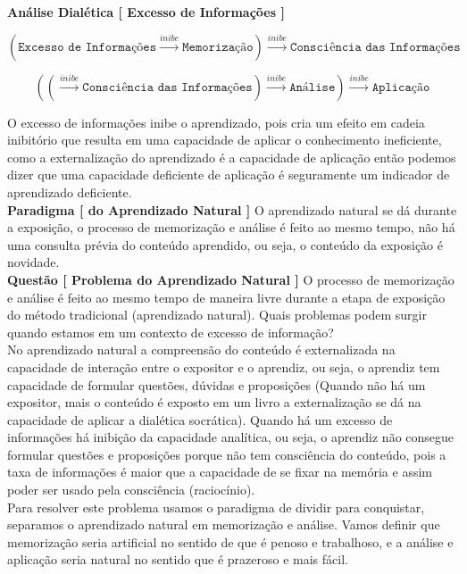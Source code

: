 \textbf{Análise Dialética [ Excesso de Informações ]}

$$  (\texttt{Excesso de Informações} \overset{inibe}{\rightarrow} \texttt{Memorização} ) \overset{inibe}{\rightarrow} \texttt{Consciência das Informações}  $$

$$ ( (\overset{inibe}{\rightarrow} \texttt{Consciência das Informações}) \overset{inibe}{\rightarrow} \texttt{Análise} ) \overset{inibe}{\rightarrow} \texttt{Aplicação}  $$

\hrulefill

O excesso de informações inibe o aprendizado, pois cria um efeito em cadeia inibitório que resulta em uma capacidade de aplicar o conhecimento ineficiente, como a externalização do aprendizado é a capacidade de aplicação então podemos dizer que uma capacidade deficiente de aplicação é seguramente um indicador de aprendizado deficiente.\\

\textbf{Paradigma [ do Aprendizado Natural ]} O aprendizado natural se dá durante a exposição, o processo de memorização e análise é feito ao mesmo tempo, não há uma consulta prévia do conteúdo aprendido, ou seja, o conteúdo da exposição é novidade.\\

\textbf{Questão [ Problema do Aprendizado Natural ]} O processo de memorização e análise é feito ao mesmo tempo de maneira livre durante a etapa de exposição do método tradicional (aprendizado natural). Quais problemas podem surgir quando estamos em um contexto de excesso de informação?\\

No aprendizado natural a compreensão do conteúdo é externalizada na capacidade de interação entre o expositor e o aprendiz, ou seja, o aprendiz tem capacidade de formular questões, dúvidas e proposições (Quando não há um expositor, mais o conteúdo é exposto em um livro a externalização se dá na capacidade de aplicar a dialética socrática). Quando há um excesso de informações há inibição da capacidade analítica, ou seja, o aprendiz não consegue formular questões e proposições porque não tem consciência do conteúdo, pois a taxa de informações é maior que a capacidade de se fixar na memória e assim poder ser usado pela consciência (raciocínio).\\

Para resolver este problema usamos o paradigma de dividir para conquistar, separamos o aprendizado natural em memorização e análise. Vamos definir que memorização seria artificial no sentido de que é penoso e trabalhoso, e a análise e aplicação seria natural no sentido que é prazeroso e mais fácil.\\


